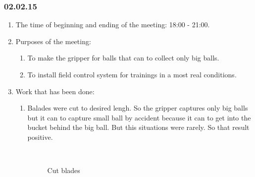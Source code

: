 \subsubsection{02.02.15}
\begin{enumerate}
	
	\item The time of beginning and ending of the meeting: 18:00 - 21:00.
	
	\item Purposes of the meeting: 
	\begin{enumerate}
		
		\item To make the gripper for balls that can to collect only big balls.
		
		\item To install field control system for trainings in a most real conditions.
		
	\end{enumerate}

	\item Work that has been done:
	\begin{enumerate}
		
		\item Balades were cut to desired lengh. So the gripper captures only big balls but it can to capture small ball by accident because it can to get into the bucket behind the big ball. But this situations were rarely. So that result positive.
		\begin{figure}[H]
			\begin{minipage}[h]{0.2\linewidth}
				\center  
			\end{minipage}
			\begin{minipage}[h]{0.6\linewidth}
				\caption{Cut blades}
			\end{minipage}
		\end{figure}
		

\end{enumerate}
\end{enumerate}
